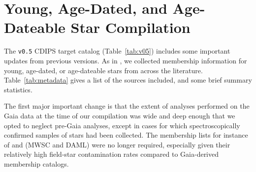 \documentclass[12pt,modern,twocolumn,tighten]{aastex63}
\begin{document}

% 
% 
% 
% 
% 


\clearpage
                            
 

\appendix
\section{Young, Age-Dated, and Age-Dateable Star Compilation}
\label{app:targetlist}




The \texttt{v0.5} CDIPS target catalog (Table~\ref{tab:v05}) includes
some important updates from previous versions.  As in
\citet{bouma_cdipsI_2019}, we collected membership information for
young, age-dated, or age-dateable stars from across the literature.
Table~\ref{tab:metadata} gives a list of the sources included, and
some brief summary statistics.

The first major important change is that the extent of analyses
performed on the Gaia data at the time of our compilation was wide and
deep enough that we opted to neglect pre-Gaia analyses, except in
cases for which spectroscopically confirmed samples of stars had been
collected.  The membership lists for instance of
\citet{Kharchenko_et_al_2013} and \citet{dias_proper_2014} (MWSC and
DAML) were no longer required, especially given their relatively high
field-star contamination rates compared to Gaia-derived membership
catalogs.
\end{document}
